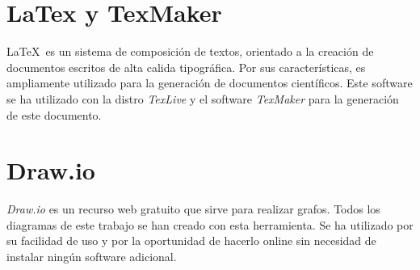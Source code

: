\section{LaTex y TexMaker}

\LaTeX \, es un sistema de composición de textos, orientado a la creación de documentos escritos de alta calida tipográfica. Por sus características, es ampliamente utilizado para la generación de documentos científicos. Este software se ha utilizado con la distro \textit{TexLive} y el software \textit{TexMaker} para la generación de este documento.\\

\section{Draw.io}

\textit{Draw.io} es un recurso web gratuito que sirve para realizar grafos. Todos los diagramas de este trabajo se han creado con esta herramienta. Se ha utilizado por su facilidad de uso y por la oportunidad de hacerlo online sin necesidad de instalar ningún software adicional.\\

